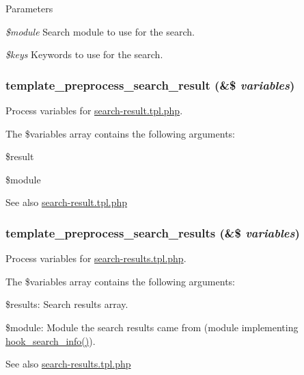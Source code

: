 \begin{DoxyParams}{Parameters}
\item[{\em \$module}]Search module to use for the search. \item[{\em \$keys}]Keywords to use for the search. \end{DoxyParams}
\hypertarget{search_8pages_8inc_a45d5ee9444aba311056f3949e503b426}{
\subsubsection[{template\_\-preprocess\_\-search\_\-result}]{\setlength{\rightskip}{0pt plus 5cm}template\_\-preprocess\_\-search\_\-result (\&\$ {\em variables})}}
\label{search_8pages_8inc_a45d5ee9444aba311056f3949e503b426}
Process variables for \hyperlink{search-result_8tpl_8php}{search-\/result.tpl.php}.

The \$variables array contains the following arguments:
\begin{DoxyItemize}
\item \$result
\item \$module
\end{DoxyItemize}

\begin{DoxySeeAlso}{See also}
\hyperlink{search-result_8tpl_8php}{search-\/result.tpl.php} 
\end{DoxySeeAlso}
\hypertarget{search_8pages_8inc_aa0012b762375491296b1248124a177e9}{
\subsubsection[{template\_\-preprocess\_\-search\_\-results}]{\setlength{\rightskip}{0pt plus 5cm}template\_\-preprocess\_\-search\_\-results (\&\$ {\em variables})}}
\label{search_8pages_8inc_aa0012b762375491296b1248124a177e9}
Process variables for \hyperlink{search-results_8tpl_8php}{search-\/results.tpl.php}.

The \$variables array contains the following arguments:
\begin{DoxyItemize}
\item \$results: Search results array.
\item \$module: Module the search results came from (module implementing \hyperlink{group__search_ga37b761616f2cad4796891008f2b374f3}{hook\_\-search\_\-info()}).
\end{DoxyItemize}

\begin{DoxySeeAlso}{See also}
\hyperlink{search-results_8tpl_8php}{search-\/results.tpl.php} 
\end{DoxySeeAlso}
